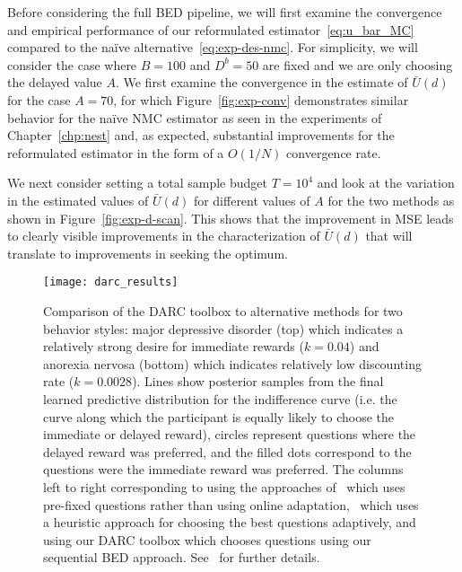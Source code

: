 Before considering the full BED pipeline, we will first examine the convergence and empirical
performance of our
reformulated estimator~\eqref{eq:u_bar_MC}  compared to the na\"{i}ve alternative~\eqref{eq:exp-des-nmc}.
For simplicity, we will consider the case 
where $B=100$ and $D^b = 50$ are fixed and we are only choosing the delayed value $A$.
We first examine the convergence in the estimate of $\bar{U}(d)$ for the case $A=70$,
for which Figure~\ref{fig:exp-conv} demonstrates similar behavior for the na\"{i}ve NMC estimator
as seen in the experiments of Chapter~\ref{chp:nest} and, as expected, substantial improvements
for the reformulated estimator in the form of a $O(1/N)$ convergence rate.

We next consider setting a total sample budget $T=10^4$ and look at the variation in the 
estimated values of $\bar{U}(d)$ for different values of $A$ for the two methods as 
shown in Figure~\ref{fig:exp-d-scan}. This shows that the improvement in MSE leads 
to clearly visible improvements in the characterization of $\bar{U}(d)$ that
will translate to improvements in seeking the optimum.

\begin{figure}[t]
	\centering
		\texttt{[image: darc\_results]}
	\caption{Comparison of the DARC toolbox to alternative methods for two behavior styles: major
		depressive disorder (top) which indicates a relatively strong desire for immediate rewards ($k=0.04$)
		and anorexia nervosa (bottom) which indicates relatively low discounting rate ($k=0.0028$).  Lines show
		posterior samples from the final learned predictive distribution for the indifference curve (i.e. the curve
		along which the participant is equally likely to choose the immediate or delayed reward), circles represent
		questions where the delayed reward was preferred, and the filled dots correspond to the questions were
		the immediate reward was preferred.  The columns left to right corresponding to using the approaches
		of~\cite{Kirby:2009eu} which uses pre-fixed questions rather than using online adaptation,~\cite{Frye:2016eu}
		which uses a heuristic approach for choosing the best questions adaptively, and using our DARC toolbox
		which chooses questions using our sequential BED approach.  See~\cite{vincent2017darc} for further details.
		\label{fig:design:darc}
	}
\end{figure}

